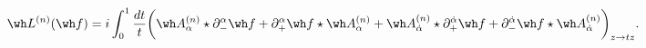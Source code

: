 \begin{equation}
\wh L^{(n)}(\wh f) = i \int_0^1 \frac{dt}{t} \bigg( 
\wh A_\alpha^{(n)} \star \partial^\alpha_- \wh f + 
\partial^\alpha_+ \wh f \star \wh A_\alpha^{(n)}
+ \wh A_{\dot\alpha}^{(n)} \star \partial^{\dot\alpha}_+ \wh f +
\partial^{\dot\alpha}_- 
\wh f \star \wh A_{\dot\alpha}^{(n)} \bigg)_{z\rightarrow tz}.
\end{equation}

